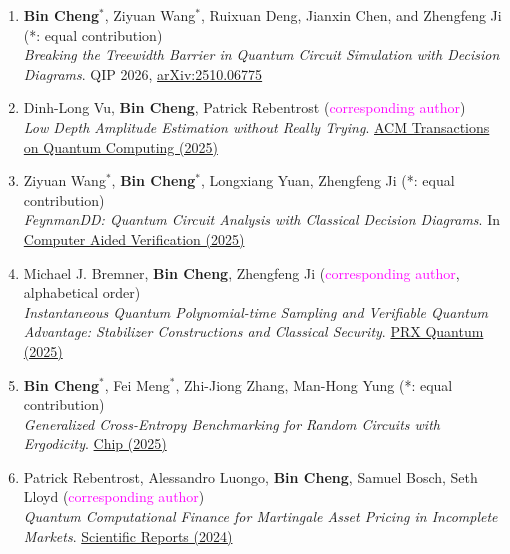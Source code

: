 \documentclass[margin,line,a4paper]{resume}
\newcommand{\lightblue}[1]{\textcolor{blue!60!cyan}{#1}}
\newcommand{\magenta}[1]{\textcolor{magenta}{#1}}
\newcommand{\lightred}[1]{\textcolor{red!80!yellow}{#1}}
\begin{document}
\begin{resume}
\begin{enumerate}
    \item \textbf{Bin Cheng}$^*$, Ziyuan Wang$^*$, Ruixuan Deng, Jianxin Chen, and Zhengfeng Ji (\lightblue{*: equal contribution}) \\
    \emph{Breaking the Treewidth Barrier in Quantum Circuit Simulation with Decision Diagrams}. QIP 2026, \href{https://arxiv.org/abs/2510.06775}{arXiv:2510.06775}
    
    \item Dinh-Long Vu, \textbf{Bin Cheng}, Patrick Rebentrost (\magenta{corresponding author}) \\
    \emph{Low Depth Amplitude Estimation without Really Trying}. \href{https://dl.acm.org/doi/10.1145/3748666}{ACM Transactions on Quantum Computing (2025)}


    \item Ziyuan Wang$^*$, \textbf{Bin Cheng}$^*$, Longxiang Yuan, Zhengfeng Ji (\lightblue{*: equal contribution}) \\
    \emph{FeynmanDD: Quantum Circuit Analysis with Classical Decision Diagrams}. In \href{https://link.springer.com/chapter/10.1007/978-3-031-98685-7_2}{Computer Aided Verification (2025)} 

    \item Michael J. Bremner, \textbf{Bin Cheng}, Zhengfeng Ji (\magenta{corresponding author}, \lightred{alphabetical order}) \\
    \emph{Instantaneous Quantum Polynomial-time Sampling and Verifiable Quantum Advantage: Stabilizer Constructions and Classical Security}. \href{https://journals.aps.org/prxquantum/abstract/10.1103/PRXQuantum.6.020315}{PRX Quantum (2025)}
    
    \item \textbf{Bin Cheng}$^*$, Fei Meng$^*$, Zhi-Jiong Zhang, Man-Hong Yung (\lightblue{*: equal contribution}) \\
    \emph{Generalized Cross-Entropy Benchmarking for Random Circuits with Ergodicity}. \href{https://www.sciencedirect.com/science/article/pii/S2709472325000012}{Chip (2025)}
    
    \item Patrick Rebentrost, Alessandro Luongo, \textbf{Bin Cheng}, Samuel Bosch, Seth Lloyd (\magenta{corresponding author}) \\
    \emph{Quantum Computational Finance for Martingale Asset Pricing in Incomplete Markets}. \href{https://www.nature.com/articles/s41598-024-68838-1}{Scientific Reports (2024)}
    

\end{enumerate}
\end{resume}
\end{document}
